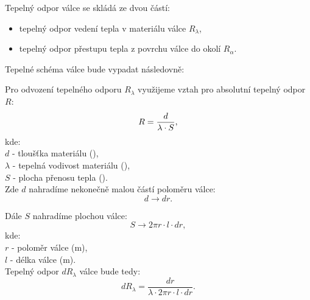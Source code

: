 \documentclass{article}
\begin{document}
Tepelný odpor válce se skládá ze dvou částí:
\begin{itemize}
    \item tepelný odpor vedení tepla v materiálu válce $R_\lambda$,
    \item tepelný odpor přestupu tepla z povrchu válce do okolí $R_\alpha$.
\end{itemize}

Tepelné schéma válce bude vypadat následovně:

\begin{center}
\end{center}

Pro odvození tepelného odporu $R_\lambda$ využijeme vztah pro absolutní tepelný odpor $R$:
\begin{equation}
    R = \frac{d}{\lambda \cdot S},
    \unit{(\ueqKandWinv)}
\end{equation}
kde:\\
$d$ - tloušťka materiálu (\uM),\\
$\lambda$ - tepelná vodivost materiálu (\ueqWandMinvKinv),\\
$S$ - plocha přenosu tepla (\ueqMsq).\\

Zde $d$ nahradíme nekonečně malou částí poloměru válce:
$$
    d \rightarrow dr.
$$

Dále $S$ nahradíme plochou válce:
$$
    S \rightarrow 2 \pi r \cdot l \cdot dr,
$$
kde:\\
$r$ - poloměr válce (m),\\
$l$ - délka válce (m).\\

Tepelný odpor $dR_\lambda$ válce bude tedy:
$$
    dR_\lambda = \frac{dr}{\lambda \cdot 2 \pi r \cdot l \cdot dr}.
$$
\end{document}
